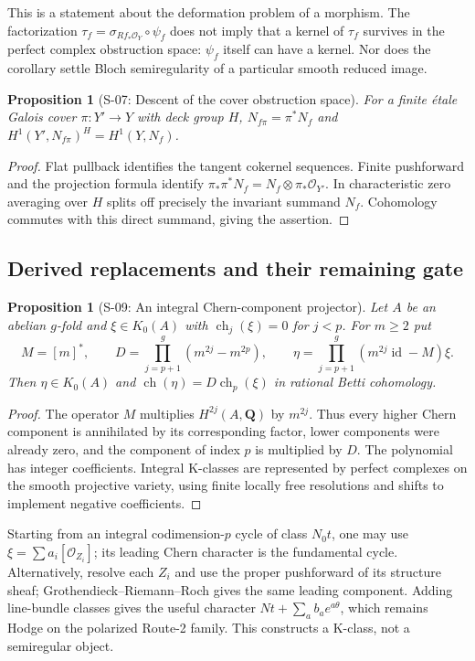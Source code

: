 \documentclass[11pt,a4paper]{article}
\newtheorem{proposition}[theorem]{Proposition}
\theoremstyle{definition}
\begin{document}
This is a statement about the deformation problem of a morphism.
The factorization
$\tau_f=\sigma_{Rf_*\mathcal O_Y}\circ\psi_f$
does not imply that a kernel of $\tau_f$ survives in the perfect
complex obstruction space: $\psi_f$ itself can have a kernel.
Nor does the corollary settle Bloch semiregularity of a particular
smooth reduced image.

\begin{proposition}[S-07: Descent of the cover obstruction space]
\label{prop:semireg-cover-invariants}
For a finite \'etale Galois cover $\pi:Y'\to Y$ with deck group $H$,
$N_{f\pi}=\pi^*N_f$ and
$H^1(Y',N_{f\pi})^H=H^1(Y,N_f)$.
\end{proposition}
\begin{proof}
Flat pullback identifies the tangent cokernel sequences.
Finite pushforward and the projection formula identify
$\pi_*\pi^*N_f=N_f\otimes\pi_*\mathcal O_{Y'}$.
In characteristic zero averaging over $H$ splits off precisely
the invariant summand $N_f$. Cohomology commutes with this direct
summand, giving the assertion.
\end{proof}

\subsection{Derived replacements and their remaining gate}

\begin{proposition}[S-09: An integral Chern-component projector]
\label{prop:semireg-k-projector}
Let $A$ be an abelian $g$-fold and $\xi\in K_0(A)$ with
$\operatorname{ch}_j(\xi)=0$ for $j<p$. For $m\geq2$ put
\[
 M=[m]^*,\qquad
 D=\prod_{j=p+1}^g(m^{2j}-m^{2p}),\qquad
 \eta=\prod_{j=p+1}^g(m^{2j}\operatorname{id}-M)\xi.
\]
Then $\eta\in K_0(A)$ and
$\operatorname{ch}(\eta)=D\operatorname{ch}_p(\xi)$ in rational
Betti cohomology.
\end{proposition}
\begin{proof}
The operator $M$ multiplies $H^{2j}(A,\mathbf Q)$ by $m^{2j}$.
Thus every higher Chern component is annihilated by its corresponding
factor, lower components were already zero, and the component of
index $p$ is multiplied by $D$. The polynomial has integer
coefficients. Integral K-classes are represented by perfect complexes
on the smooth projective variety, using finite locally free
resolutions and shifts to implement negative coefficients.
\end{proof}

Starting from an integral codimension-$p$ cycle of class $N_0t$,
one may use $\xi=\sum a_i[\mathcal O_{Z_i}]$; its leading Chern
character is the fundamental cycle. Alternatively, resolve each
$Z_i$ and use the proper pushforward of its structure sheaf;
Grothendieck--Riemann--Roch gives the same leading component.
Adding line-bundle classes gives the useful character
$Nt+\sum_a b_a e^{a\theta}$, which remains Hodge on the polarized
Route-2 family. This constructs a K-class, not a semiregular object.
\end{document}
